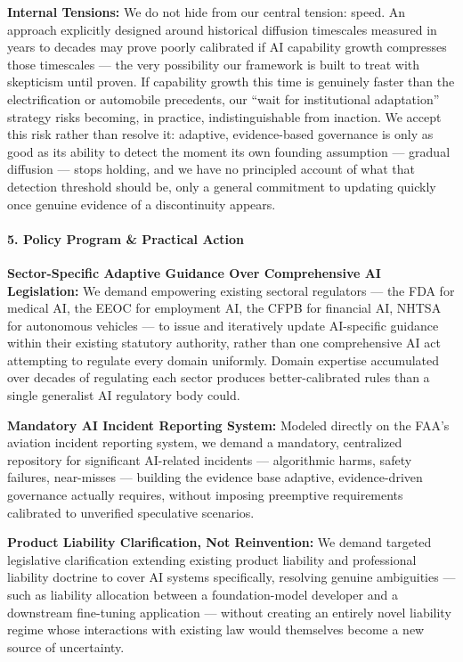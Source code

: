 \textbf{Internal Tensions:} We do not hide from our central tension:
speed. An approach explicitly designed around historical diffusion
timescales measured in years to decades may prove poorly calibrated if
AI capability growth compresses those timescales --- the very
possibility our framework is built to treat with skepticism until
proven. If capability growth this time is genuinely faster than the
electrification or automobile precedents, our ``wait for institutional
adaptation'' strategy risks becoming, in practice, indistinguishable
from inaction. We accept this risk rather than resolve it: adaptive,
evidence-based governance is only as good as its ability to detect the
moment its own founding assumption --- gradual diffusion --- stops
holding, and we have no principled account of what that detection
threshold should be, only a general commitment to updating quickly once
genuine evidence of a discontinuity appears.

\paragraph{5. Policy Program \& Practical
Action}\label{policy-program-practical-action-20}

\textbf{Sector-Specific Adaptive Guidance Over Comprehensive AI
Legislation:} We demand empowering existing sectoral regulators --- the
FDA for medical AI, the EEOC for employment AI, the CFPB for financial
AI, NHTSA for autonomous vehicles --- to issue and iteratively update
AI-specific guidance within their existing statutory authority, rather
than one comprehensive AI act attempting to regulate every domain
uniformly. Domain expertise accumulated over decades of regulating each
sector produces better-calibrated rules than a single generalist AI
regulatory body could.

\textbf{Mandatory AI Incident Reporting System:} Modeled directly on the
FAA's aviation incident reporting system, we demand a mandatory,
centralized repository for significant AI-related incidents ---
algorithmic harms, safety failures, near-misses --- building the
evidence base adaptive, evidence-driven governance actually requires,
without imposing preemptive requirements calibrated to unverified
speculative scenarios.

\textbf{Product Liability Clarification, Not Reinvention:} We demand
targeted legislative clarification extending existing product liability
and professional liability doctrine to cover AI systems specifically,
resolving genuine ambiguities --- such as liability allocation between a
foundation-model developer and a downstream fine-tuning application ---
without creating an entirely novel liability regime whose interactions
with existing law would themselves become a new source of uncertainty.


